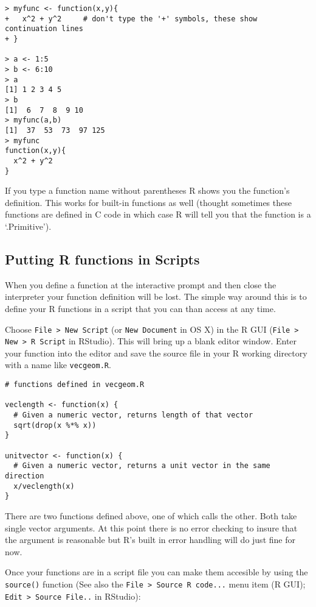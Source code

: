 \begin{lstlisting}
> myfunc <- function(x,y){
+   x^2 + y^2     # don't type the '+' symbols, these show continuation lines
+ }

> a <- 1:5
> b <- 6:10
> a
[1] 1 2 3 4 5
> b
[1]  6  7  8  9 10
> myfunc(a,b)
[1]  37  53  73  97 125
> myfunc
function(x,y){
  x^2 + y^2
}
\end{lstlisting}
If you type a function name without parentheses R shows you the
function's definition. This works for built-in functions as well
(thought sometimes these functions are defined in C code in which case R
will tell you that the function is a `.Primitive').

\subsection{Putting R functions in Scripts}

When you define a function at the interactive prompt and then close the
interpreter your function definition will be lost. The simple way around
this is to define your R functions in a script that you can than access
at any time.

Choose \lstinline!File > New Script! (or \lstinline!New Document! in OS
X) in the R GUI (\lstinline!File > New > R Script! in RStudio). This
will bring up a blank editor window. Enter your function into the editor
and save the source file in your R working directory with a name like
\lstinline!vecgeom.R!.

\begin{lstlisting}
# functions defined in vecgeom.R

veclength <- function(x) {
  # Given a numeric vector, returns length of that vector
  sqrt(drop(x %*% x))
}

unitvector <- function(x) {
  # Given a numeric vector, returns a unit vector in the same direction
  x/veclength(x)
}
\end{lstlisting}
There are two functions defined above, one of which calls the other.
Both take single vector arguments. At this point there is no error
checking to insure that the argument is reasonable but R's built in
error handling will do just fine for now.

Once your functions are in a script file you can make them accesible by
using the \lstinline!source()! function (See also the
\lstinline!File > Source R code...! menu item (R GUI);
\lstinline!Edit > Source File..! in RStudio):

